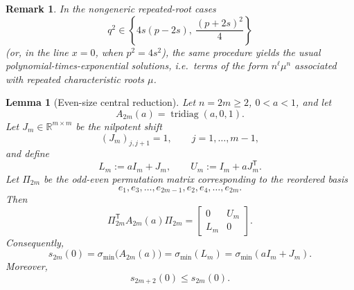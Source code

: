 \documentclass[11pt]{article}
\numberwithin{equation}{section}
\newtheorem{lemma}[theorem]{Lemma}
\newtheorem{remark}[theorem]{Remark}
\begin{document}
\begin{remark}
In the nongeneric repeated-root cases
\[
q^2\in\left\{4s(p-2s),\ \frac{(p+2s)^2}{4}\right\}
\]
(or, in the line $x=0$, when $p^2=4s^2$), the same procedure yields the usual
polynomial-times-exponential solutions, i.e.\ terms of the form
$n^\ell \mu^n$ associated with repeated characteristic roots $\mu$.
\end{remark}

\begin{lemma}[Even-size central reduction]\label{lem:even-central-reduction}
Let \(n=2m\ge 2\), \(0<a<1\), and let
\[
A_{2m}(a)=\operatorname{tridiag}(a,0,1).
\]
Let \(J_m\in\mathbb R^{m\times m}\) be the nilpotent shift
\[
(J_m)_{j,j+1}=1,\qquad j=1,\dots,m-1,
\]
and define
\[
L_m:=aI_m+J_m,\qquad U_m:=I_m+aJ_m^{\mathsf T}.
\]
Let \(\Pi_{2m}\) be the odd-even permutation matrix corresponding to the reordered basis
\[
e_1,e_3,\dots,e_{2m-1},e_2,e_4,\dots,e_{2m}.
\]
Then
\[
\Pi_{2m}^{\mathsf T}A_{2m}(a)\Pi_{2m}
=
\begin{bmatrix}
0 & U_m\\
L_m & 0
\end{bmatrix}.
\]
Consequently,
\[
s_{2m}(0)=\sigma_{\min}\!\bigl(A_{2m}(a)\bigr)=\sigma_{\min}(L_m)=\sigma_{\min}(aI_m+J_m).
\]
Moreover,
\[
s_{2m+2}(0)\le s_{2m}(0).
\]
\end{lemma}
\end{document}
